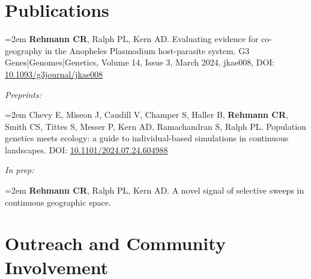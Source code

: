 \documentclass[11pt]{extarticle}
\newcommand{\NewPart}[1]{\section*{{#1}}}
\begin{document}
\NewPart{Publications}

\vspace{2.5mm}
\noindent\hangindent=2em \textbf{Rehmann CR}, Ralph PL, Kern AD. Evaluating evidence for co-geography in the Anopheles Plasmodium host-parasite system.  G3 Genes|Genomes|Genetics, Volume 14, Issue 3, March 2024, jkae008, DOI: \href{doi.org/10.1093/g3journal/jkae008}{10.1093/g3journal/jkae008}

\vspace{2.5mm}
\noindent\textit{Preprints:}

\noindent\hangindent=2em Chevy E, Miseon J, Caudill V, Champer S, Haller B, \textbf{Rehmann CR}, Smith CS, Tittes S, Messer P, Kern AD, Ramachandran S, Ralph PL. Population genetics meets ecology: a guide to individual-based simulations in continuous landscapes. DOI: \href{doi.org/10.1101/2024.07.24.604988}{10.1101/2024.07.24.604988}

\vspace{2.5mm}
\noindent\textit{In prep:}

\noindent\hangindent=2em \textbf{Rehmann CR}, Ralph PL, Kern AD. A novel signal of selective sweeps in continuous geographic space.

\NewPart{Outreach and Community Involvement}
\end{document}
